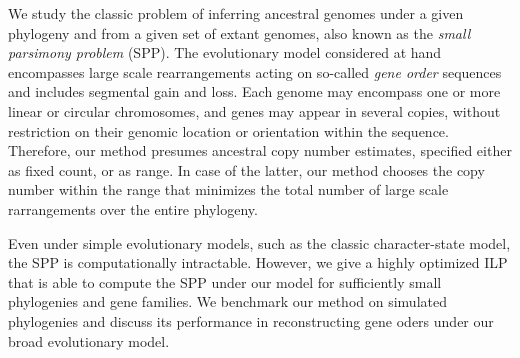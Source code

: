     We study the classic problem of inferring ancestral genomes under a given phylogeny and from a given set of extant genomes, also known as the \emph{small parsimony problem} (SPP).
    The evolutionary model considered at hand encompasses large scale rearrangements acting on so-called \emph{gene order} sequences and includes segmental gain and loss. Each genome may encompass one or more linear or circular chromosomes, and genes may appear in several copies, without restriction on their genomic location or orientation within the sequence.
    Therefore, our method presumes ancestral copy number estimates, specified either as fixed count, or as range. 
    In case of the latter, our method chooses the copy number within the range that minimizes the total number of large scale rarrangements over the entire phylogeny. 
    
Even under simple evolutionary models, such as the classic character-state model, the SPP is computationally intractable.
However, we give a highly optimized ILP that is able to compute the SPP under our model for sufficiently small phylogenies and gene families. We benchmark our method on simulated phylogenies and discuss its performance in reconstructing gene oders under our broad evolutionary model. 

